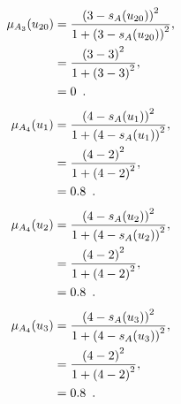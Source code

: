 \documentclass[a4paper,openany]{book}
\begin{document}
				\begin{align}
					\mu_{A_3}(u_{20}) &= \frac{\left(3-s_A(u_{20})\right)^2}{1 + \left(3-s_A(u_{20})\right)^2} ,\\
					&= \frac{\left(3-3\right)^2}{1 + \left(3-3\right)^2} \notag ,\\
					&= 0 \enspace. \notag
				\end{align}
				\begin{align}
					\mu_{A_4}(u_1) &= \frac{\left(4-s_A(u_1)\right)^2}{1 + \left(4-s_A(u_1)\right)^2} ,\\
					&= \frac{\left(4-2\right)^2}{1 + \left(4-2\right)^2} \notag ,\\
					&= 0.8 \enspace. \notag
				\end{align}
				\begin{align}
					\mu_{A_4}(u_2) &= \frac{\left(4-s_A(u_2)\right)^2}{1 + \left(4-s_A(u_2)\right)^2} ,\\
					&= \frac{\left(4-2\right)^2}{1 + \left(4-2\right)^2} \notag ,\\
					&= 0.8 \enspace. \notag
				\end{align}
				\begin{align}
					\mu_{A_4}(u_3) &= \frac{\left(4-s_A(u_3)\right)^2}{1 + \left(4-s_A(u_3)\right)^2} ,\\
					&= \frac{\left(4-2\right)^2}{1 + \left(4-2\right)^2} \notag ,\\
					&= 0.8 \enspace. \notag
				\end{align}
\end{document}
